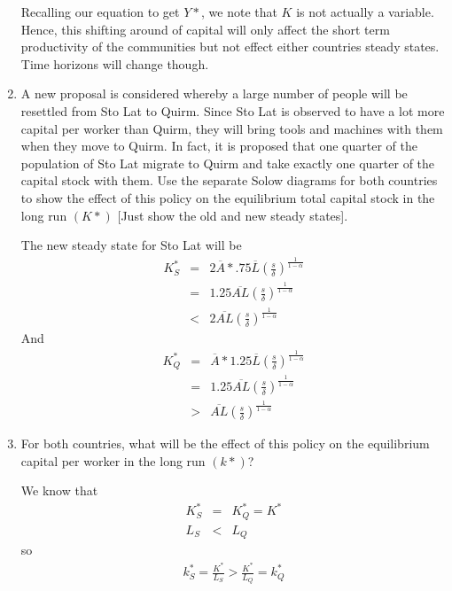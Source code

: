 \documentclass[11pt]{SelfArxOneColBMN}
\begin{document}
\begin{enumerate}[label=\alph*]
  \begin{solution}
    Recalling our equation to get $Y*$, we note that $K$ is not actually a variable. Hence, this shifting around of capital will only affect the short term productivity of the communities but not effect either countries steady states. Time horizons will change though. 
  \end{solution}
  \item A new proposal is considered whereby a large number of people will be resettled from Sto Lat to Quirm. Since Sto Lat is observed to have a lot more capital per worker than Quirm, they will bring tools and machines with them when they move to Quirm. In fact, it is proposed that one quarter of the population of Sto Lat migrate to Quirm and take exactly one quarter of the capital stock with them. Use the separate Solow diagrams for both countries to show the effect of this policy on the equilibrium total capital stock in the long run $(K*)$ [Just show the old and new steady states].
  \begin{solution}
    The new steady state for Sto Lat will be
    \begin{eqnarray*}
      K^*_{S} &=& 2\overline{A}*.75\overline{L}(\frac{s}{\delta})^\frac{1}{1 - \alpha}\\
      &=& 1.25\overline{AL}(\frac{s}{\delta})^\frac{1}{1 - \alpha}\\
      &<& 2\overline{AL}(\frac{s}{\delta})^\frac{1}{1 - \alpha}
    \end{eqnarray*}
    And
    \begin{eqnarray*}
      K^*_{Q} &=& \overline{A}*1.25\overline{L}(\frac{s}{\delta})^\frac{1}{1 - \alpha}\\
      &=& 1.25\overline{AL}(\frac{s}{\delta})^\frac{1}{1 - \alpha}\\
      &>& \overline{AL}(\frac{s}{\delta})^\frac{1}{1 - \alpha} 
    \end{eqnarray*}
  \end{solution}
  \item For both countries, what will be the effect of this policy on the equilibrium capital per worker in the long run $(k*)$?
  \begin{solution}
    We know that
    \begin{eqnarray*}
      K^*_S &=& K^*_Q = K^*\\
      L_S &<& L_Q 
    \end{eqnarray*}
    so
    \begin{eqnarray*}
      k^*_S = \frac{K^*}{L_S} > \frac{K^*}{L_Q} = k^*_Q

\end{eqnarray*}
\end{solution}
\end{enumerate}
\end{document}
